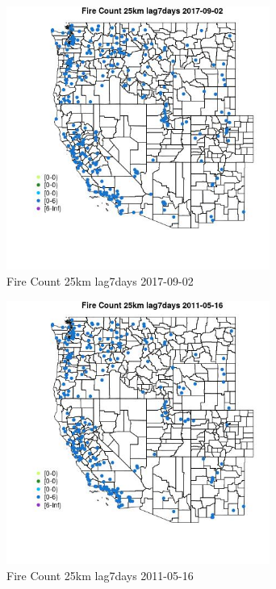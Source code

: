 \begin{figure} 
\centering  
\includegraphics[width=0.77\textwidth]{Code_Outputs/Report_ML_input_PM25_Step4_part_e_de_duplicated_aves_compiled_2019-05-21wNAs_MapObsFire_Count_25km_lag7days2017-09-02.jpg} 
\caption{\label{fig:Report_ML_input_PM25_Step4_part_e_de_duplicated_aves_compiled_2019-05-21wNAsMapObsFire_Count_25km_lag7days2017-09-02}Fire Count 25km lag7days 2017-09-02} 
\end{figure} 
 

\begin{figure} 
\centering  
\includegraphics[width=0.77\textwidth]{Code_Outputs/Report_ML_input_PM25_Step4_part_e_de_duplicated_aves_compiled_2019-05-21wNAs_MapObsFire_Count_25km_lag7days2011-05-16.jpg} 
\caption{\label{fig:Report_ML_input_PM25_Step4_part_e_de_duplicated_aves_compiled_2019-05-21wNAsMapObsFire_Count_25km_lag7days2011-05-16}Fire Count 25km lag7days 2011-05-16} 
\end{figure} 
 

